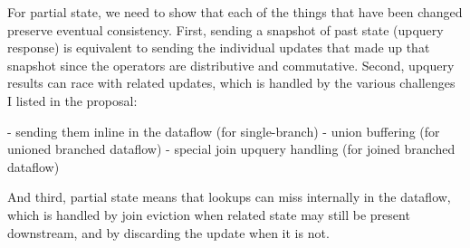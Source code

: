 For partial state, we need to show that each of the things that have been
changed preserve eventual consistency. First, sending a snapshot of past state
(upquery response) is equivalent to sending the individual updates that made
up that snapshot since the operators are distributive and commutative. Second,
upquery results can race with related updates, which is handled by the various
challenges I listed in the proposal:

 - sending them inline in the dataflow (for single-branch)
 - union buffering (for unioned branched dataflow)
 - special join upquery handling (for joined branched dataflow)

And third, partial state means that lookups can miss internally in the
dataflow, which is handled by join eviction when related state may still be
present downstream, and by discarding the update when it is not.
